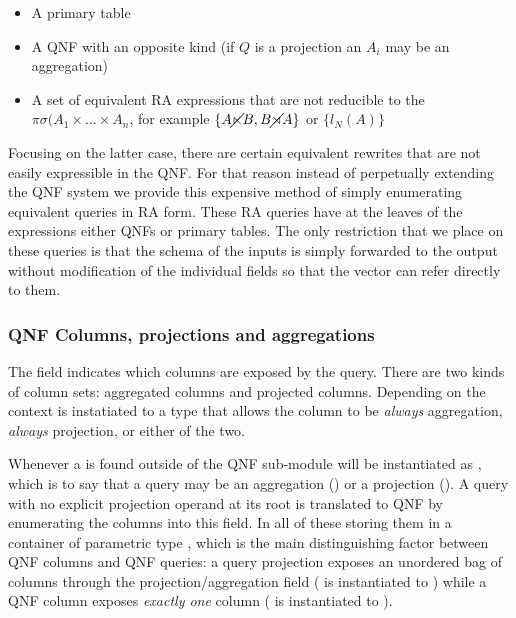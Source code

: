 \begin{itemize}
\item A primary table
\item A QNF with an opposite kind  (if \(Q\) is a
  projection an \(A_i\) may be an aggregation)
\item A set of equivalent RA expressions that are not reducible to the
  \(\pi \sigma(A_1 \times ... \times A_n\), for example \(\{A \cancel\ltimes
  B,B \cancel\rtimes A\}\) or \(\{l_N(A)\}\)
\end{itemize}

Focusing on the latter case, there are certain equivalent rewrites
that are not easily expressible in the QNF. For that reason instead of
perpetually extending the QNF system we provide this expensive method
of simply enumerating equivalent queries in RA form. These RA queries
have at the leaves of the expressions either QNFs or primary
tables. The only restriction that we place on these queries is that
the schema of the inputs is simply forwarded to the output without
modification of the individual fields so that the  vector can
refer directly to them.

\subsubsection{QNF Columns, projections and aggregations}
\label{sec:qnf_proj_aggr}

The  field
indicates which columns are exposed by the query. There are two kinds
of column sets: aggregated columns and projected columns. Depending on
the context  is instatiated to a type that allows the
column to be \emph{always} aggregation, \emph{always} projection, or
either of the two.

Whenever a  is found outside of the QNF sub-module
 will be instantiated as , which is to say
that a query may be an aggregation () or a projection
(). A query with no explicit projection operand at its root is
translated to QNF by enumerating the columns into this field. In all of
these storing them in a container of parametric type , which is
the main distinguishing factor between QNF columns and QNF queries: a query
projection exposes an unordered bag of columns through the projection/aggregation
field ( is instantiated to ) while a QNF column exposes
\emph{exactly one} column ( is instantiated to ).

